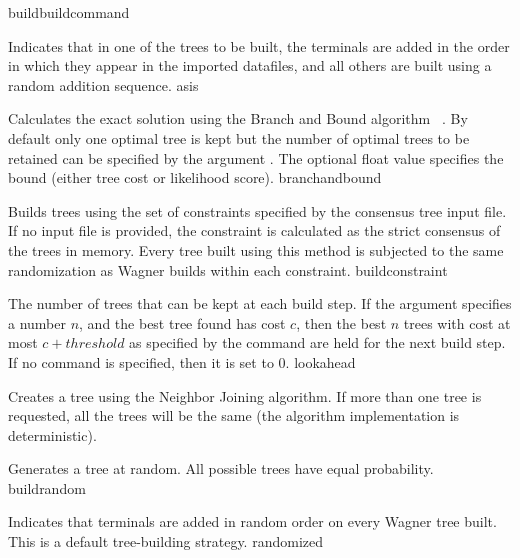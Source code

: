 \begin{command}{build}{buildcommand}
\begin{arguments}
            {Indicates that in one of the trees to be built, the terminals are
            added in the order in which they appear in the imported datafiles,
            and all others are built using a random addition sequence.}
            {asis}

            {Calculates the exact solution using the Branch and Bound algorithm
            ~\cite{hendy1982}. By default only one optimal tree is kept but
            the number of optimal trees to be retained can be specified by the
            argument . The optional float value specifies the
            bound (either tree cost or likelihood score).}
            {branchandbound} 

            {Builds trees using the set of constraints specified by the consensus
            tree input file. If no input file is provided, the constraint is calculated as
            the strict consensus of the trees in memory. Every tree built
            using this method is subjected to the same randomization as Wagner
            builds within each constraint.}
            {buildconstraint}

            {The number of trees that can be kept at each build step. If the
             argument 
            specifies a number $n$, and the best tree found has cost $c$, then the best $n$
            trees with cost at most $c + threshold$ as specified by
            the  command are held for the
            next build step. If no  command is specified,
            then it is set to $0$.}
            {lookahead}

            {Creates a tree using the Neighbor Joining algorithm. If more than
            one tree is requested, all the trees will be the same (the algorithm
            implementation is deterministic).}{}

            {Generates a tree at random.  All possible trees have equal probability.}
            {buildrandom}

            {Indicates that terminals are added in random order on every Wagner tree built. 
            This is a default tree-building strategy.}
            {randomized}


\end{arguments}
\end{command}
